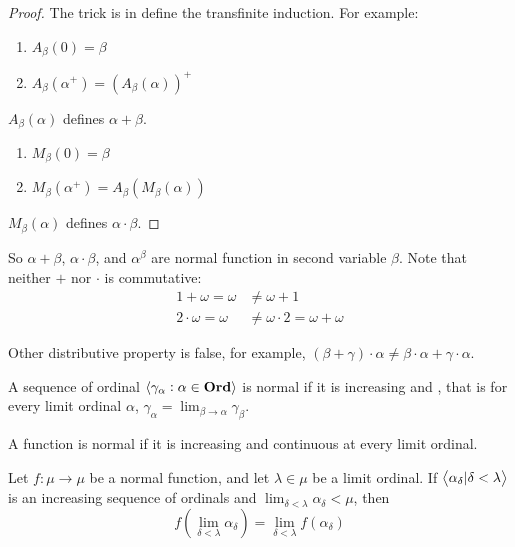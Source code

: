 \begin{proof}
    The trick is in define the transfinite induction. For example:
    \begin{enumerate}
        \item $A_\beta (0)= \beta$
        \item $A_\beta (\alpha^{+})= \left(A_\beta (\alpha) \right)^{+}$
    \end{enumerate}
    $A_\beta(\alpha)$ defines $\alpha + \beta$.
    \begin{enumerate}
        \item $M_\beta (0)= \beta$
        \item $M_\beta (\alpha^{+})= A_\beta \left(M_\beta (\alpha)\right)$
    \end{enumerate}
    $M_\beta(\alpha)$ defines $\alpha \cdot \beta$.    
\end{proof}


So $\alpha + \beta$, $\alpha \cdot \beta$, and $\alpha^\beta$ are normal function in second variable $\beta$. Note that neither $+$ nor $\cdot$ is commutative:
    \begin{equation*}
        \begin{aligned}
            1 + \omega = \omega &\neq \omega + 1 \\
            2 \cdot \omega = \omega &\neq \omega \cdot 2 = \omega + \omega
        \end{aligned}
    \end{equation*}

Other distributive property is false, for example, $(\beta + \gamma) \cdot  \alpha \neq \beta \cdot \alpha + \gamma \cdot \alpha$.


\begin{definition}
    A sequence of ordinal $\left< \gamma_\alpha : \alpha \in \mathbf{Ord} \right>$ is normal if it is increasing and , that is for every limit ordinal $\alpha$, $\displaystyle \gamma_\alpha = \lim_{\beta \rightarrow \alpha} \gamma_\beta$.
\end{definition}

\begin{definition}
    A function is normal if it is increasing and continuous at every limit ordinal.
\end{definition}

\begin{theorem}
    Let $f: \mu \rightarrow \mu$ be a normal function, and let $\lambda \in \mu $ be a limit ordinal. If $\left< \alpha_\delta | \delta < \lambda \right>$ is an increasing sequence of ordinals and $ \displaystyle \lim_{\delta < \lambda} \alpha_\delta < \mu$, then
    \begin{equation}
        f(\lim_{\delta < \lambda} \alpha_\delta) =  \lim_{\delta < \lambda} f(\alpha_\delta) 
    \end{equation}
\end{theorem}

